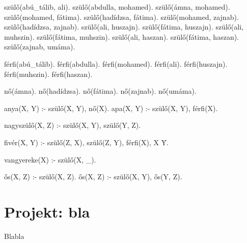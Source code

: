 \begin{program}
szülő(abú_tálib, ali).
szülő(abdulla, mohamed).
szülő(ámna, mohamed).
szülő(mohamed, fátima).
szülő(hadídzsa, fátima).
szülő(mohamed, zajnab).
szülő(hadídzsa, zajnab).
szülő(ali, huszajn).
szülő(fátima, huszajn).
szülő(ali, muhszin).
szülő(fátima, muhszin).
szülő(ali, haszan).
szülő(fátima, haszan).
szülő(zajnab, umáma).

férfi(abú_tálib).
férfi(abdulla).
férfi(mohamed).
férfi(ali).
férfi(huszajn).
férfi(muhszin).
férfi(haszan).

nő(ámna).
nő(hadídzsa).
nő(fátima).
nő(zajnab).
nő(umáma).

anya(X, Y) :- szülő(X, Y), nő(X).     %
apa(X, Y) :- szülő(X, Y), férfi(X).   %

nagyszülő(X, Z) :- szülő(X, Y), szülő(Y, Z).

fivér(X, Y) :- szülő(Z, X), szülő(Z, Y), férfi(X), X \= Y.

vangyereke(X) :- szülő(X, _).

ős(X, Z) :- szülő(X, Z).
ős(X, Z) :- szülő(X, Y), ős(Y, Z).
\end{program}

\section{Projekt: bla}
Blabla
